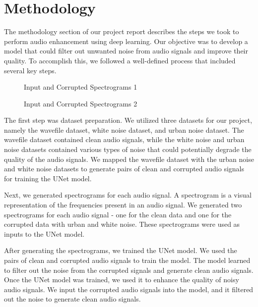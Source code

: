 \documentclass[conference]{IEEEtran}
\begin{document}
\section{Methodology}
The methodology section of our project report describes the steps we took to perform audio enhancement using deep learning. Our objective was to develop a model that could filter out unwanted noise from audio signals and improve their quality. To accomplish this, we followed a well-defined process that included several key steps.

\begin{figure}[b!]
    \centering
    
    \caption{Input and Corrupted Spectrograms 1}
\end{figure}

\begin{figure}[b!]
    \centering
    
    \caption{Input and Corrupted Spectrograms 2}
\end{figure}

The first step was dataset preparation. We utilized three datasets for our project, namely the wavefile dataset, white noise dataset, and urban noise dataset. The wavefile dataset contained clean audio signals, while the white noise and urban noise datasets contained various types of noise that could potentially degrade the quality of the audio signals. We mapped the wavefile dataset with the urban noise and white noise datasets to generate pairs of clean and corrupted audio signals for training the UNet model.

Next, we generated spectrograms for each audio signal. A spectrogram is a visual representation of the frequencies present in an audio signal. We generated two spectrograms for each audio signal - one for the clean data and one for the corrupted data with urban and white noise. These spectrograms were used as inputs to the UNet model.




After generating the spectrograms, we trained the UNet model. We used the pairs of clean and corrupted audio signals to train the model. The model learned to filter out the noise from the corrupted signals and generate clean audio signals. Once the UNet model was trained, we used it to enhance the quality of noisy audio signals. We input the corrupted audio signals into the model, and it filtered out the noise to generate clean audio signals.
\end{document}
